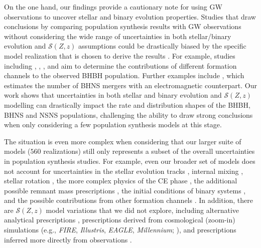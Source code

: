 \documentclass[fleqn,usenatbib]{mnras}
\newcommand{\SFRD}{\ensuremath{\mathcal{S}(Z,z)}\xspace}
\newcommand{\Nmodels}{\ensuremath{560}\xspace}
\begin{document}
On the one hand, our findings provide a cautionary note for using GW observations to uncover stellar and binary evolution properties. 
 Studies that draw conclusions by comparing population synthesis results with \ac{GW} observations without considering the wide range of uncertainties in both stellar/binary evolution and \SFRD assumptions could be drastically biased by the specific model realization that is chosen to derive the results \citep[cf.][]{Belczynski:2021,Bouffanais:2021}. 
For example, studies including \citet{Zevin:2017}, \citet{Bouffanais:2019},  \citet{Franciolini:2021}, \citet{Ng:2021} and \citet{Zevin:2021-branching-ratios} aim to determine the contributions of different formation channels to the observed \ac{BHBH} population.
Further examples include \citet{Fragione:2021}, which estimates the number of \ac{BHNS} mergers with an electromagnetic counterpart.
Our work shows that uncertainties in both stellar and binary evolution and \SFRD modelling can drastically impact the rate and distribution shapes of the \ac{BHBH}, \ac{BHNS} and \ac{NSNS} populations, challenging the ability to draw strong conclusions when only considering a few population synthesis models at this stage.  

The situation is even more complex when considering that our larger suite of models (\Nmodels realizations) still only represents a subset of the overall uncertainties in population synthesis studies. For example, even our broader set of models does not account for uncertainties in the stellar evolution tracks \citep[e.g.,][]{2020A&A...637A...6L,2020MNRAS.497.4549A}, internal mixing \citep[e.g.,][]{Schootemeijer:2019}, stellar rotation \citep[e.g.,][]{deMinkMandel:2016,Mapelli:2020}, the more complex physics of the CE phase \citep[e.g.,][]{Klencki:2021, Ivanova:2020book,2021A&A...650A.107M, Olejak:2021CE}, the additional possible remnant mass prescriptions \citep[e.g.][]{Dabrowny:2021,Mandel:2021MNRAS}, the initial conditions of binary systems \citep[e.g.,][]{deMinkBelczynski:2015,2017ApJS..230...15M,2018A&A...619A..77K}, and the possible contributions from other formation channels \citep[e.g.,][]{Zevin:2021-branching-ratios}. In addition, there are \SFRD model variations that we did not explore, including alternative analytical prescriptions \citep[e.g.,][]{Chruslinska:2019dco,Tang:2020}, prescriptions derived from cosmological (zoom-in) simulations (e.g., \emph{FIRE}, \emph{Illustris}, \emph{EAGLE}, \emph{Millennium};  \citealt{Lamberts:2016,2017MNRAS.472.2422M, duBuisson2020,Briel:2021, Chu:2021}), and prescriptions inferred more directly from observations \citep[e.g., ][]{Chruslinska:2019obsSFRD,Chruslinska:2021}.
\end{document}
